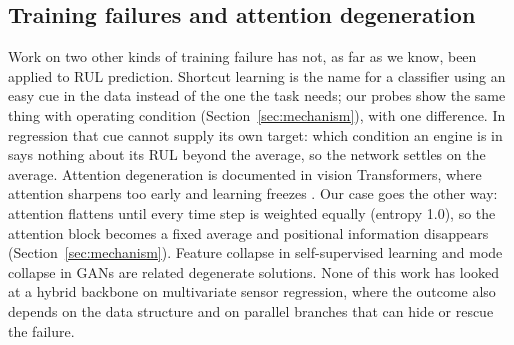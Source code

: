 \subsection{Training failures and attention degeneration}

Work on two other kinds of training failure has not, as far as we know, been
applied to RUL prediction. Shortcut learning
\cite{geirhos2020shortcut,sturm2012clever} is the name for a classifier using
an easy cue in the data instead of the one the task needs; our probes show
the same thing with operating condition (Section~\ref{sec:mechanism}), with
one difference. In regression that cue cannot supply its own target: which
condition an engine is in says nothing about its RUL beyond the average, so
the network settles on the average. Attention degeneration is documented in
vision Transformers, where attention sharpens too early and learning freezes
\cite{zhai2023stabilizing,dong2021attention}. Our case goes the other way:
attention flattens until every time step is weighted equally (entropy 1.0),
so the attention block becomes a fixed average and positional information
disappears (Section~\ref{sec:mechanism}). Feature collapse in self-supervised
learning \cite{chen2021exploring,grill2020bootstrap} and mode collapse in GANs
are related degenerate solutions. None of this work has looked at a hybrid
backbone on multivariate sensor regression, where the outcome also depends
on the data structure and on parallel branches that can hide or rescue the
failure.
